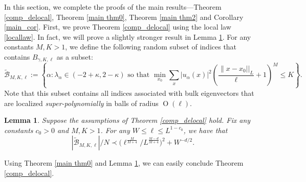 \documentclass{article}
\newcommand{\1}{\mathds{1}}
\numberwithin{equation}{section}
\newcommand{\be}{\begin{equation}}
\newcommand{\ee}{\end{equation}}
\newcommand{\wt}{\widetilde}
\renewcommand{\leq}{\leqslant}
\renewcommand{\le}{\leq}
\DeclareMathOperator{\OO}{O}
\DeclareMathOperator{\oo}{o}
\theoremstyle{plain} %
\newtheorem{lemma}[theorem]{Lemma}
\theoremstyle{remark}
\newtheorem{remark}[theorem]{Remark}
\begin{document}
In this section, we complete the proofs of the main results---Theorem \ref{comp_delocal}, Theorem \ref{main thm0}, Theorem \ref{main thm2} and Corollary \ref{main_cor}. First, we prove Theorem \ref{comp_delocal} using the local law \eqref{locallaw}. In fact, we will prove a slightly stronger result in Lemma \ref{lemm_comp_delocal}. For any constants $M, K>1$, we define the following random subset of indices that contains $B_{\gamma, K,\ell}$ as a subset:
$$
\wt{\mathcal B}_{ M, K,\ell} :=\left\{\alpha: \lambda_\alpha \in (-2+\kappa, 2-\kappa) \text{ so that  } \min_{x_0} \sum_x | u_\alpha(x)|^2 \left(\frac{\|x-x_0||_L}{\ell}+1\right)^M \le K\right\}. 
$$
Note that this subset contains all indices associated with bulk eigenvectors that are localized \emph{super-polynomially} in balls of radius $\OO(\ell)$. %

\begin{lemma} \label{lemm_comp_delocal}
	Suppose the assumptions of Theorem \ref{comp_delocal} hold. Fix any constants $c_0>0$ and $M,K>1$. For any $W\le  \ell\le L^{1 - c_0}$, we have that
	\be\label{uinf0} 
	{|\wt{\mathcal B}_{M,K,\ell}|}/{N}\prec \big(  {\ell^{\frac{M}{M+4}}}/{L^{\frac{M-d}{M+4}}}\big)^2 + W^{-d/2}.
	\ee
\end{lemma}

Using Theorem \ref{main thm0} and Lemma \ref{lemm_comp_delocal}, we can easily conclude Theorem \ref{comp_delocal}. %
\end{document}
